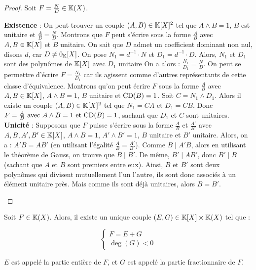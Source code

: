 \documentclass[12pt,a4paper]{report}
\begin{document}
\begin{proof}
    Soit $F = \frac ND \in \mathbb{K}(X)$.

    \begin{outline}
        \1 \textbf{Existence} : On peut trouver un couple $(A, B) \in \mathbb{K}[X]^2$ tel que $A \wedge B = 1$, $B$ est unitaire et $\frac AB = \frac ND$.
        \2 Montrons que $F$ peut s'écrire sous la forme $\frac AB$ avec $A, B \in \mathbb{K}[X]$ et $B$ unitaire.
        \3 On sait que $D$ admet un coefficient dominant non nul, disons $d$, car $D \neq 0_{\mathbb{K}}[X]$.
        \3 On pose $N_1 = d^{-1} \cdot N$ et $D_1 = d^{-1} \cdot D$. Alors, $N_1$ et $D_1$ sont des polynômes de $\mathbb{K}[X]$ avec $D_1$ unitaire
        \2 On a alors : $\frac{N_1}{D_1} = \frac ND$.
        \3 On peut se permettre d'écrire $F = \frac{N_1}{D_1}$ car ils agissent comme d'autres représentants de cette classe d'équivalence.
        \1 Montrons qu'on peut écrire $F$ sous la forme $\frac AB$ avec $A, B \in \mathbb{K}[X]$, $A \wedge B = 1$, $B$ unitaire et $\mathrm{CD}(B) = 1$.
        \2 Soit $C = N_1 \wedge D_1$.
        \2 Alors il existe un couple $(A,B) \in \mathbb{K}[X]^2$ tel que $N_1 = CA$ et $D_1 = CB$.
        \2 Donc $F = \frac AB \text{ avec } A \wedge B = 1 \text{ et } \mathrm{CD}(B) = 1$, sachant que $D_1$ et $C$ sont unitaires.
        \1 \textbf{Unicité} : Supposons que $F$ puisse s'écrire sous la forme $\frac AB$ et $\frac{A'}{B'}$ avec $A, B, A', B' \in \mathbb{K}[X]$, $A \wedge B = 1$, $A' \wedge B' = 1$, $B$ unitaire et $B'$ unitaire. Alors, on a :
        \2 $A'B = AB'$ (en utilisant l'égalité $\frac AB = \frac{A'}{B'}$).
        \2 Comme $B \mid A' B$, alors en utilisant le théorème de Gauss, on trouve que $B \mid B'$. De même, $B' \mid A B'$, donc $B' \mid B$ (sachant que $A$ et $B$ sont premiers entre eux).
        \2 Ainsi, $B$ et $B'$ sont deux polynômes qui divisent mutuellement l'un l'autre, ils sont donc associés à un élément unitaire près. Mais comme ils sont déjà unitaires, alors $B = B'$.
    \end{outline}
\end{proof}

\begin{property}
    Soit $F \in \mathbb{K}(X)$. Alors, il existe un unique couple $(E, G) \in \mathbb{K}[X] \times \mathbb{K}(X)$ tel que :

    $$\begin{cases}
    F = E + G\\
    \deg(G) < 0
    \end{cases}$$

    $E$ est appelé la partie entière de $F$, et $G$ est appelé la partie fractionnaire de $F$.
\end{property}
\end{document}
